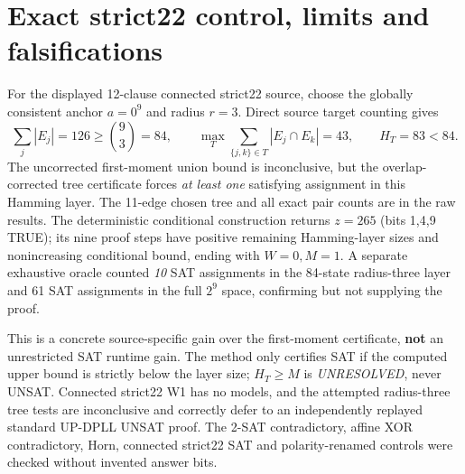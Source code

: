 \documentclass[11pt]{article}
\begin{document}
\section{Exact strict22 control, limits and falsifications}
For the displayed 12-clause connected strict22 source, choose the globally consistent anchor $a=0^9$ and radius $r=3$. Direct source target counting gives
\[
\sum_j|E_j|=126\ge\binom93=84,
\qquad\max_T\sum_{\{j,k\}\in T}|E_j\cap E_k|=43,
\qquad H_T=83<84.
\]
The uncorrected first-moment union bound is inconclusive, but the overlap-corrected tree certificate forces \emph{at least one} satisfying assignment in this Hamming layer. The 11-edge chosen tree and all exact pair counts are in the raw results. The deterministic conditional construction returns $z=265$ (bits 1,4,9 TRUE); its nine proof steps have positive remaining Hamming-layer sizes and nonincreasing conditional bound, ending with $W=0,M=1$. A separate exhaustive oracle counted \emph{10} SAT assignments in the 84-state radius-three layer and 61 SAT assignments in the full $2^9$ space, confirming but not supplying the proof.

This is a concrete source-specific gain over the first-moment certificate, \textbf{not} an unrestricted SAT runtime gain. The method only certifies SAT if the computed upper bound is strictly below the layer size; $H_T\ge M$ is \emph{UNRESOLVED}, never UNSAT. Connected strict22 W1 has no models, and the attempted radius-three tree tests are inconclusive and correctly defer to an independently replayed standard UP-DPLL UNSAT proof. The 2-SAT contradictory, affine XOR contradictory, Horn, connected strict22 SAT and polarity-renamed controls were checked without invented answer bits.
\end{document}
